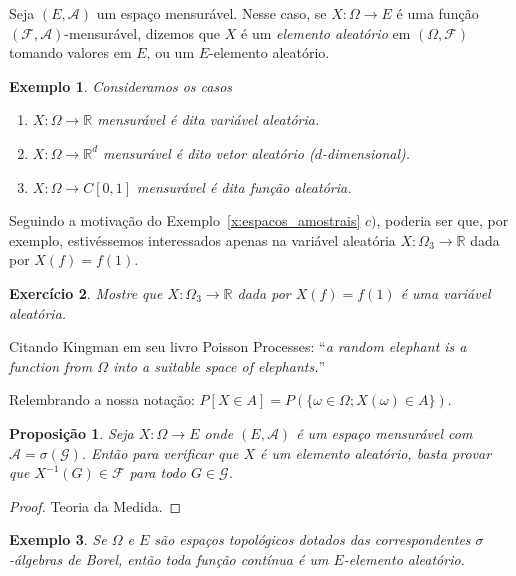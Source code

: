 \documentclass[reqno, final]{book}
\newcommand*\1{\mathds{1}}
\newtheorem{proposition}[theorem]{Proposição}
\newtheorem{example}{Exemplo}[section]
\newtheorem{exercise}[example]{Exercício}
\begin{document}
Seja $(E,\mathcal{A})$ um espaço mensurável.
Nesse caso, se $X: \Omega \to E$ é uma função $(\mathcal{F}, \mathcal{A})$-mensurável, dizemos que $X$ é um \emph{elemento aleatório}  em $(\Omega, \mathcal{F})$ tomando valores em $E$, ou um $E$-elemento aleatório.

\begin{example} Consideramos os casos
  \begin{enumerate}[\quad a)]
  \item $X:\Omega \to \mathbb{R}$ mensurável é dita variável aleatória. 
  \item $X:\Omega \to \mathbb{R}^d$ mensurável é dito vetor aleatório ($d$-dimensional).
  \item $X:\Omega \to C[0,1]$ mensurável é dita função aleatória.
  \end{enumerate}
\end{example}
Seguindo a motivação do Exemplo~\ref{x:espacos_amostrais} $c)$, poderia ser que, por exemplo, estivéssemos interessados apenas na variável aleatória $X:\Omega_3 \to \mathbb{R}$ dada por $X(f) = f(1)$.

\begin{exercise}
  Mostre que $X:\Omega_3 \to \mathbb{R}$ dada por $X(f) = f(1)$ é uma variável aleatória.
\end{exercise}

Citando Kingman em seu livro Poisson Processes: ``\emph{a random elephant is a function from $\Omega$ into a suitable space of elephants.}''

Relembrando a nossa notação: $P[X \in A] = P(\{\omega \in \Omega; X(\omega) \in A\})$.

\begin{proposition}
  Seja $X:\Omega \to E$ onde $(E, \mathcal{A})$ é um espaço mensurável com $\mathcal{A} = \sigma(\mathcal{G})$.
  Então para verificar que $X$ é um elemento aleatório, basta provar que $X^{-1}(G) \in \mathcal{F}$ para todo $G \in \mathcal{G}$.
\end{proposition}

\begin{proof}
  Teoria da Medida.
\end{proof}

\begin{example}
  Se $\Omega$ e $E$ são espaços topológicos dotados das correspondentes $\sigma$-álgebras de Borel, então toda função contínua é um $E$-elemento aleatório.
\end{example}
\end{document}
